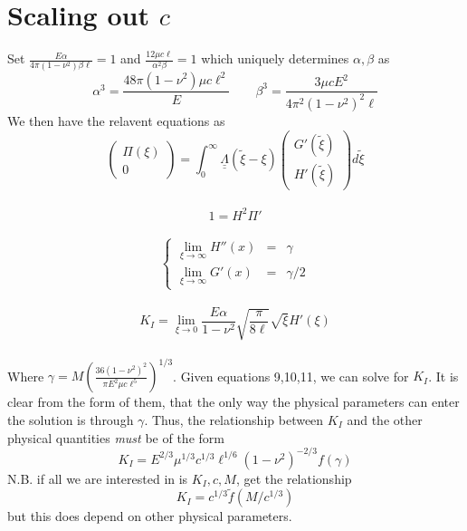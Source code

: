 \documentclass{article}
\begin{document}
\section{Scaling out $c$}
Set $\displaystyle \frac{E\alpha}{4\pi (1-\nu^2)\beta \ell} =1$ 
and $\displaystyle \frac{12\mu c\ell}{\alpha^2 \beta}=1 $
which uniquely determines $\alpha, \beta$ as
\[ \alpha^3 = \frac{48\pi(1-\nu^2) \mu c \ell^2}{E} \qquad
 \beta^3 = \frac{3\mu c E^2}{4\pi^2 (1 - \nu^2)^2 \ell} \]
We then have the relavent equations as 
\\
\begin{equation}
 \left( \begin{array}{c} \Pi(\xi) \\ 0 \end{array} \right) =
\int_0^{\infty} 
\underline{\underline{\Lambda}}(\tilde{\xi}- \xi) 
\left( \begin{array}{c} G'(\tilde{\xi}) \\[4pt] H'(\tilde{\xi}) \end{array} 
\right) d\tilde{\xi}
\end{equation}
\\
\begin{equation}
1 = H^2 \Pi'
\end{equation}
\\
\begin{equation}
\left\{ \begin{array}{ccc}
\displaystyle \lim_{\xi\to\infty} H''(x) & = & \gamma \\
\displaystyle \lim_{\xi\to\infty} G'(x) & = & \gamma/2  
\end{array} \right.
\end{equation}
\\
\begin{equation}
K_I = \lim_{\xi\to 0} \frac{E\alpha}{1-\nu^2} \sqrt{\frac{\pi}{8\ell}} 
\sqrt{\xi} H'(\xi)
\end{equation}
\\
Where $\gamma = M \left( \frac{36(1-\nu^2)^2}{\pi E^2 \mu c \ell^5} 
\right)^{1/3}$. Given equations 9,10,11, we can solve for $K_I$. It is 
clear from the form of them, that the only way the physical parameters
can enter the solution is through $\gamma$. Thus, the relationship between
$K_I$ and the other physical quantities \emph{must} be of the form
\[ K_I = E^{2/3} \mu^{1/3} c^{1/3} \ell^{1/6}(1-\nu^2)^{-2/3} f(\gamma) \]
N.B. if all we are interested in is $K_I,c,M$, get the relationship
\[K_I = c^{1/3} \tilde{f}(M/c^{1/3}) \]
but this does depend on other physical parameters.
\end{document}

